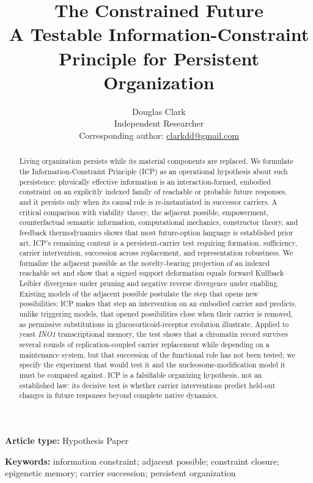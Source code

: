 \documentclass[11pt]{article}
\title{\textbf{The Constrained Future}\\
\large A Testable Information-Constraint Principle for Persistent Organization}
\author{Douglas Clark\\
\small Independent Researcher\\
\small Corresponding author: \href{mailto:clarkdd@gmail.com}{clarkdd@gmail.com}}
\date{}
\begin{document}
\maketitle

\noindent\textbf{Article type:} Hypothesis Paper

\begin{abstract}
Living organization persists while its material components are replaced. We
formulate the Information-Constraint Principle (ICP) as an operational
hypothesis about such persistence: physically effective information is an
interaction-formed, embodied constraint on an explicitly indexed family of
reachable or probable future responses, and it persists only when its causal
role is re-instantiated in successor carriers. A critical comparison with
viability theory, the adjacent possible, empowerment, counterfactual semantic
information, computational mechanics, constructor theory, and feedback
thermodynamics shows that most future-option language is established prior
art. ICP's remaining content is a persistent-carrier test requiring formation,
sufficiency, carrier intervention, succession across replacement, and
representation robustness. We formalize the adjacent possible as the
novelty-bearing projection of an indexed reachable set and show that a signed
support deformation equals forward Kullback--Leibler divergence under pruning
and negative reverse divergence under enabling. Existing models of the adjacent
possible postulate the step that opens new possibilities; ICP makes that step
an intervention on an embodied carrier and predicts, unlike triggering models,
that opened possibilities close when their carrier is removed, as permissive
substitutions in glucocorticoid-receptor evolution illustrate. Applied to yeast \textit{INO1}
transcriptional memory, the test shows that a chromatin record survives several
rounds of replication-coupled carrier replacement while depending on a
maintenance system, but that succession of the functional role has not been
tested; we specify the experiment that would test it and the
nucleosome-modification model it must be compared against. ICP is a
falsifiable organizing hypothesis, not an established law: its decisive test is
whether carrier interventions predict held-out changes in future responses
beyond complete native dynamics.
\end{abstract}

\noindent\textbf{Keywords:} information constraint; adjacent possible;
constraint closure; epigenetic memory; carrier succession; persistent
organization
\end{document}
